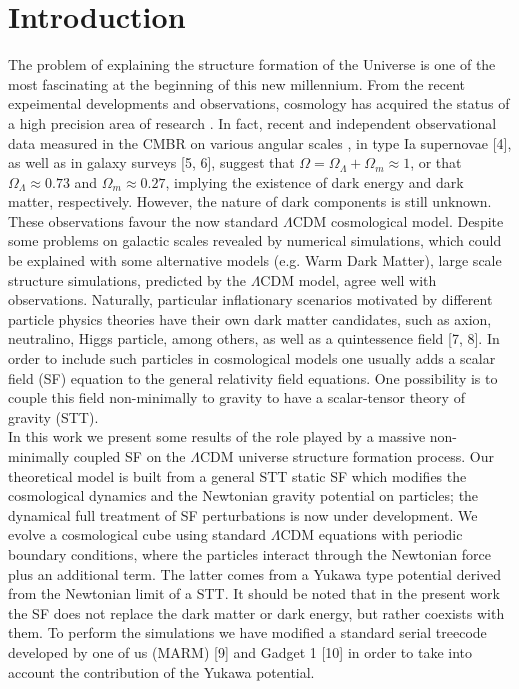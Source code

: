 \documentclass[10pt,times]{IEEEtran}
\begin{document}
\section{\textbf{Introduction}}
The problem of explaining the structure formation of
the Universe is one of the most fascinating at the beginning of this new millennium. From the recent expeimental developments and observations, cosmology has
acquired the status of a high precision area of research
 \cite{Bib_1}. In fact, recent and independent observational data
measured in the CMBR on various angular scales  \cite{bib_2}, in
type Ia supernovae [4], as well as in galaxy surveys [5, 6],
suggest that \(\Omega = \Omega_{\Lambda} + \Omega_{m}\approx 1\), or that  \(\Omega_{\Lambda}\approx 0.73\) and  \( \Omega_{m}\approx 0.27\), implying the existence of dark energy and
dark matter, respectively. However, the nature of dark
components is still unknown. These observations favour
the now standard \(\Lambda\)CDM cosmological model. Despite
some problems on galactic scales revealed by numerical
simulations, which could be explained with some alternative models (e.g. Warm Dark Matter), large scale structure simulations, predicted by the \(\Lambda\)CDM model, agree
well with observations. Naturally, particular inflationary
scenarios motivated by different particle physics theories
have their own dark matter candidates, such as axion,
neutralino, Higgs particle, among others, as well as a
quintessence field [7, 8]. In order to include such particles in cosmological models one usually adds a scalar field
(SF) equation to the general relativity field equations.
One possibility is to couple this field non-minimally to
gravity to have a scalar-tensor theory of gravity (STT).\\

In this work we present some results of the role played
by a massive non-minimally coupled SF on the \(\Lambda\)CDM
universe structure formation process. Our theoretical
model is built from a general STT static SF which modifies the cosmological dynamics and the Newtonian gravity potential on particles; the dynamical full treatment of
SF perturbations is now under development. We evolve a
cosmological cube using standard \(\Lambda\)CDM equations with
periodic boundary conditions, where the particles interact through the Newtonian force plus an additional term.
The latter comes from a Yukawa type potential derived
from the Newtonian limit of a STT. It should be noted
that in the present work the SF does not replace the dark matter or dark energy, but rather coexists with them. To
perform the simulations we have modified a standard serial treecode developed by one of us (MARM) [9] and
Gadget 1 [10] in order to take into account the contribution of the Yukawa potential.
\end{document}

